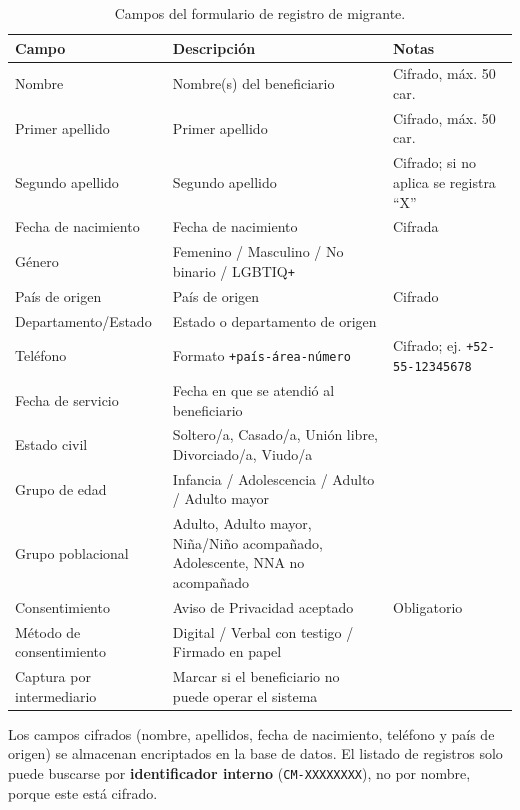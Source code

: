 \documentclass[10pt,letterpaper]{report}
\begin{document}
\begin{table}[H]\centering
\caption{Campos del formulario de registro de migrante.}
\label{tab:campos_migrante}
\begin{tabularx}{\textwidth}{l X l}
\toprule
\textbf{Campo} & \textbf{Descripción} & \textbf{Notas}\\
\midrule
Nombre                & Nombre(s) del beneficiario & Cifrado, máx. 50 car.\\
Primer apellido       & Primer apellido & Cifrado, máx. 50 car.\\
Segundo apellido      & Segundo apellido & Cifrado; si no aplica se registra ``X''\\
Fecha de nacimiento   & Fecha de nacimiento & Cifrada\\
Género                & Femenino / Masculino / No binario / LGBTIQ\texttt{+} & \\
País de origen        & País de origen & Cifrado\\
Departamento/Estado   & Estado o departamento de origen & \\
Teléfono              & Formato \texttt{+país-área-número} & Cifrado; ej. \texttt{+52-55-12345678}\\
Fecha de servicio     & Fecha en que se atendió al beneficiario & \\
Estado civil          & Soltero/a, Casado/a, Unión libre, Divorciado/a, Viudo/a & \\
Grupo de edad         & Infancia / Adolescencia / Adulto / Adulto mayor & \\
Grupo poblacional     & Adulto, Adulto mayor, Niña/Niño acompañado, Adolescente, NNA no acompañado & \\
Consentimiento        & Aviso de Privacidad aceptado & Obligatorio\\
Método de consentimiento & Digital / Verbal con testigo / Firmado en papel & \\
Captura por intermediario & Marcar si el beneficiario no puede operar el sistema & \\
\bottomrule
\end{tabularx}
\end{table}

\begin{nota}
Los campos cifrados (nombre, apellidos, fecha de nacimiento, teléfono y país de origen) se almacenan encriptados en la base de datos. El listado de registros solo puede buscarse por \textbf{identificador interno} (\texttt{CM-XXXXXXXX}), no por nombre, porque este está cifrado.
\end{nota}
\end{document}
